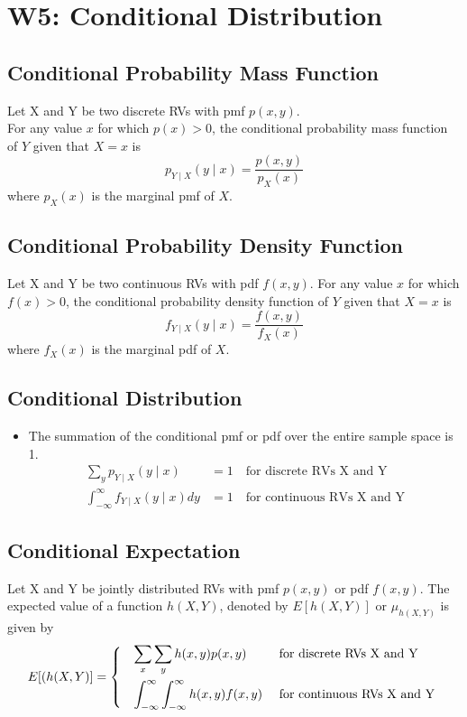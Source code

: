 \documentclass[a4paper]{article}
\begin{document}
\section{W5: Conditional Distribution}
\subsection{Conditional Probability Mass Function} 
Let X and Y be two discrete RVs with pmf $p(x, y)$.\\For any value $x$ for which $p(x) > 0$, the conditional probability mass function of $Y$ given that $X = x$ is 
$$p_{Y\mid X}(y\mid x) = \frac{p(x, y)}{p_{X}(x)}
$$
where $p_{X}(x)$ is the marginal pmf of $X$.
\subsection{Conditional Probability Density Function} 
Let X and Y be two continuous RVs with pdf $f(x, y)$. For any value $x$ for which $f(x) > 0$, the conditional probability density function of $Y$ given that $X = x$ is 
$$f_{Y\mid X}(y\mid x) = \frac{f(x, y)}{f_{X}(x)}
$$
where $f_{X}(x)$ is the marginal pdf of $X$.
\subsection{Conditional Distribution}
\begin{itemize}
    \item The summation of the conditional pmf or pdf over the entire sample space is 1.
    \begin{align*}
        \sum_{y}p_{Y\mid X}(y\mid x) &= 1 \quad \text{for discrete RVs X and Y}\\
        \int_{-\infty}^{\infty}f_{Y\mid X}(y\mid x) dy & = 1 \quad \text{for continuous RVs X and Y}
    \end{align*}
\end{itemize}
\subsection{Conditional Expectation}
Let X and Y be jointly distributed RVs with pmf $p(x, y)$ or pdf $f(x, y)$. The expected value of a function $h(X, Y)$, denoted by $E[h(X, Y)]$ or $\mu_{h(X, Y)}$ is given by
\begin{align*}
    E[(h(X, Y)] =
    \begin{dcases*}
    \quad \sum_{x}\sum_{y}h(x, y)p(x, y) &\mbox{} \text{for discrete RVs X and Y}\\
    \quad \int_{-\infty}^{\infty}\int_{-\infty}^{\infty}h(x, y)f(x, y) &\mbox{} \text{for continuous RVs X and Y}
    \end{dcases*}
\end{align*}
\end{document}
